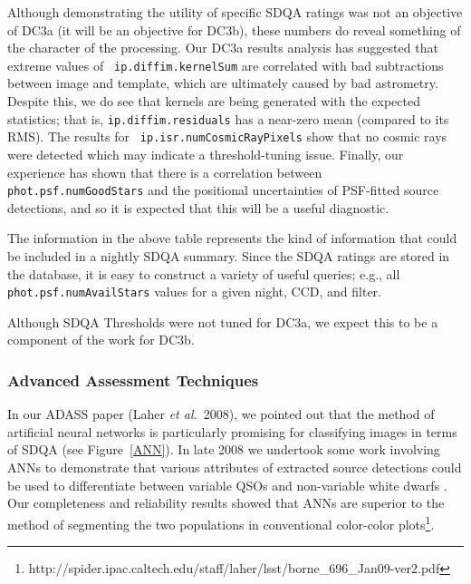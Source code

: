 Although demonstrating the utility of specific SDQA ratings was not an
objective of DC3a (it will be an objective for DC3b), these numbers do
reveal something of the character of the processing.  Our DC3a results
analysis has suggested that extreme values of {\tt
  ip.diffim.kernelSum} are correlated with bad subtractions between
image and template, which are ultimately caused by bad astrometry.
Despite this, we do see that kernels are being generated with the
expected statistics; that is, {\tt ip.diffim.residuals} has a
near-zero mean (compared to its RMS).   The results for {\tt
  ip.isr.numCosmicRayPixels} show that no cosmic rays were detected
which may indicate a threshold-tuning issue.  Finally, our experience
has shown that there is a correlation between {\tt
  phot.psf.numGoodStars} and the positional uncertainties of
PSF-fitted source detections, and so it is expected that this will be 
a useful diagnostic.

The information in the above table represents the kind of information
that could be included in a nightly SDQA summary.  Since the SDQA
ratings are stored in the database, it is easy to construct a variety
of useful queries; e.g., all {\tt phot.psf.numAvailStars} values for a
given night, CCD, and filter.

Although SDQA Thresholds were not tuned for DC3a, we expect this to be
a component of the work for DC3b.


\subsubsection{Advanced Assessment Techniques}

In our ADASS paper (Laher {\it et al.}~2008), we pointed out that the method of 
artificial neural networks is particularly promising for classifying images in 
terms of SDQA (see Figure~\ref{ANN}).  In late 2008 we undertook some work 
involving ANNs to demonstrate that various attributes of extracted
source detections could be used to differentiate between variable QSOs
and non-variable white dwarfs \citet{borne09}.  Our completeness and
reliability results showed that ANNs  are superior to the method of
segmenting the two populations in conventional color-color plots\footnote{
http://spider.ipac.caltech.edu/staff/laher/lsst/borne\_696\_Jan09-ver2.pdf
}.

